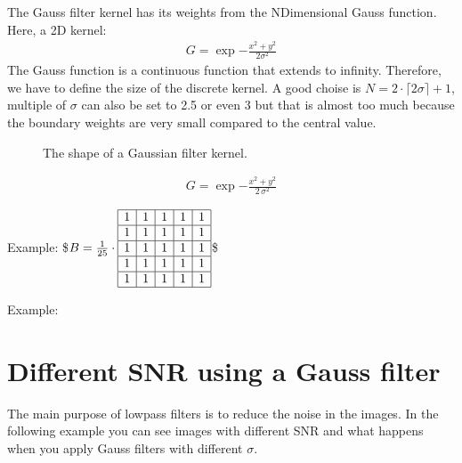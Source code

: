 \documentclass[letterpaper,10pt,english]{sphinxmanual}
\begin{document}
\sphinxAtStartPar
The Gauss filter kernel has its weights from the N\sphinxhyphen{}Dimensional Gauss function. Here, a 2D kernel:
\begin{equation*}
\begin{split}G=\exp{-\frac{x^2+y^2}{2\sigma^2}}\end{split}
\end{equation*}
\sphinxAtStartPar
The Gauss function is a continuous function that extends to infinity. Therefore, we have to define the size of the discrete kernel. A good choise is \(N=2\cdot\lceil 2 \sigma \rceil+1\), multiple of \(\sigma\) can also be set to 2.5 or even 3 but that is almost too much because the boundary weights are very small compared to the central value.

\begin{figure}[htbp]
\centering
\capstart

\noindent{}
\caption{The shape of a Gaussian filter kernel.}\label{\detokenize{02-ImageEnhancement:id8}}\end{figure}




\begin{equation*}
\begin{split}G=\exp{-\frac{x^2+y^2}{2\,\sigma^2}}\end{split}
\end{equation*}




\sphinxAtStartPar
Example:
\$\(B=\frac{1}{25}\cdot\begin{array}{|c|c|c|c|c|}
\hline
1 & 1 & 1 & 1& 1\\
\hline
1 & 1 & 1 & 1& 1\\
\hline
1 & 1 & 1 & 1& 1\\
\hline
1 & 1 & 1 & 1& 1\\
\hline
1 & 1 & 1 & 1& 1\\
\hline
\end{array}
\)\$



\sphinxAtStartPar
Example:






\section{Different SNR using a Gauss filter}
\label{\detokenize{02-ImageEnhancement:different-snr-using-a-gauss-filter}}
\sphinxAtStartPar
The main purpose of lowpass filters is to reduce the noise in the images. In the following example you can see images with different SNR and what happens when you apply Gauss filters with different \(\sigma\).
\end{document}

